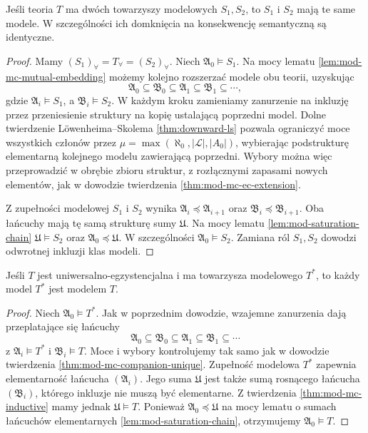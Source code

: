 \begin{twierdzenie}
\label{thm:mod-mc-companion-unique}
Jeśli teoria $T$ ma dwóch towarzyszy modelowych
$S_1,S_2$, to $S_1$ i $S_2$ mają te same modele.
W szczególności ich domknięcia na konsekwencję
semantyczną są identyczne.
\end{twierdzenie}
\begin{proof}
Mamy $(S_1)_{\forall}=T_{\forall}=(S_2)_{\forall}$.
Niech $\mathfrak A_0\models S_1$. Na mocy lematu
\ref{lem:mod-mc-mutual-embedding} możemy kolejno
rozszerzać modele obu teorii, uzyskując
\[
\mathfrak A_0\subseteq\mathfrak B_0
\subseteq\mathfrak A_1\subseteq\mathfrak B_1
\subseteq\cdots,
\]
gdzie $\mathfrak A_i\models S_1$, a
$\mathfrak B_i\models S_2$. W każdym kroku zamieniamy
zanurzenie na inkluzję przez przeniesienie struktury
na kopię ustalającą poprzedni model.
Dolne twierdzenie Löwenheima--Skolema
\ref{thm:downward-ls} pozwala ograniczyć moce wszystkich
członów przez $\mu=\max(\aleph_0,|\mathcal L|,|A_0|)$,
wybierając podstrukturę elementarną kolejnego modelu
zawierającą poprzedni. Wybory można więc przeprowadzić
w obrębie zbioru struktur, z rozłącznymi zapasami nowych
elementów, jak w dowodzie twierdzenia
\ref{thm:mod-mc-ec-extension}.

Z zupełności modelowej $S_1$ i $S_2$ wynika
$\mathfrak A_i\preccurlyeq\mathfrak A_{i+1}$
oraz $\mathfrak B_i\preccurlyeq\mathfrak B_{i+1}$.
Oba łańcuchy mają tę samą strukturę sumy $\mathfrak U$.
Na mocy lematu \ref{lem:mod-saturation-chain}
$\mathfrak U\models S_2$ oraz
$\mathfrak A_0\preccurlyeq\mathfrak U$.
W szczególności $\mathfrak A_0\models S_2$.
Zamiana ról $S_1,S_2$ dowodzi odwrotnej inkluzji
klas modeli.
\end{proof}

\begin{lemat}
\label{lem:mod-mc-companion-extension}
Jeśli $T$ jest uniwersalno-egzystencjalna i ma
towarzysza modelowego $T^*$, to każdy model $T^*$
jest modelem $T$.
\end{lemat}
\begin{proof}
Niech $\mathfrak A_0\models T^*$. Jak w poprzednim
dowodzie, wzajemne zanurzenia dają przeplatające się
łańcuchy
\[
\mathfrak A_0\subseteq\mathfrak B_0
\subseteq\mathfrak A_1\subseteq\mathfrak B_1
\subseteq\cdots
\]
z $\mathfrak A_i\models T^*$ i $\mathfrak B_i\models T$.
Moce i wybory kontrolujemy tak samo jak w dowodzie
twierdzenia \ref{thm:mod-mc-companion-unique}.
Zupełność modelowa $T^*$ zapewnia elementarność
łańcucha $(\mathfrak A_i)$.
Jego suma $\mathfrak U$ jest także sumą rosnącego
łańcucha $(\mathfrak B_i)$, którego inkluzje nie
muszą być elementarne.
Z twierdzenia \ref{thm:mod-mc-inductive} mamy jednak
$\mathfrak U\models T$. Ponieważ
$\mathfrak A_0\preccurlyeq\mathfrak U$ na mocy
lematu o sumach łańcuchów elementarnych
\ref{lem:mod-saturation-chain}, otrzymujemy
$\mathfrak A_0\models T$.
\end{proof}

